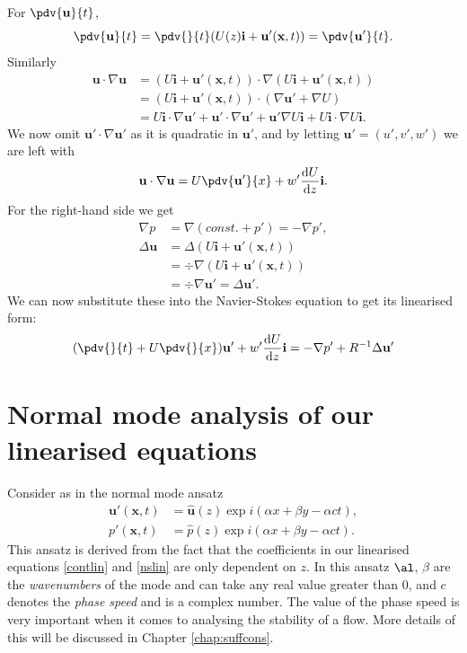 For $ \pdv{\mathbf{u}}{t} $, 
\begin{equation}
    \pdv{\mathbf{u}}{t} = \pdv{}{t} (U(z) \mathbf{i} + \mathbf{u}'(\mathbf{x}, t)) = \pdv{\mathbf{u}'}{t}.
\end{equation}
Similarly
\begin{align}
    \mathbf{u} \cdot \nabla \mathbf{u} &= (U \mathbf{i} + \mathbf{u}' (\mathbf{x}, t)) \cdot \nabla (U \mathbf{i} + \mathbf{u}' (\mathbf{x}, t)) \nonumber\\
    &= (U \mathbf{i} + \mathbf{u}' (\mathbf{x}, t)) \cdot (\nabla \mathbf{u}' + \nabla U) \nonumber\\
    &= U \mathbf{i} \cdot \nabla \mathbf{u}' + \mathbf{u}' \cdot \nabla \mathbf{u}' + \mathbf{u}' \nabla U \mathbf{i} + U \mathbf{i} \cdot \nabla U \mathbf{i}.
\end{align}
We now omit $ \mathbf{u}' \cdot \nabla \mathbf{u}' $ as it is quadratic in $ \mathbf{u}' $, and by letting $ \mathbf{u}' = (u', v', w') $ we are left with
\begin{equation}
    \mathbf{u} \cdot \nabla \mathbf{u} = U \pdv{\mathbf{u}'}{x} + w' \frac{\text{d}U}{\text{d}z} \mathbf{i}.
\end{equation}
For the right-hand side we get
\begin{align}
    \nabla p &= \nabla (const. + p') = -\nabla p', \nonumber\\
    \Delta \mathbf{u} &= \Delta (U \mathbf{i} + \mathbf{u}' (\mathbf{x}, t)) \nonumber\\
    &= \div{\nabla (U \mathbf{i} + \mathbf{u}' (\mathbf{x}, t))} \nonumber\\
    &= \div{\nabla \mathbf{u}'} = \Delta \mathbf{u}'.
\end{align}
We can now substitute these into the Navier-Stokes equation to get its linearised form:
\begin{equation}
    (\pdv{}{t} + U \pdv{}{x}) \mathbf{u}' + w' \frac{\text{d}U}{\text{d}z} \mathbf{i} = - \nabla p' + R^{-1} \Delta \mathbf{u}'
\label{nslin}
\end{equation}

\section{Normal mode analysis of our linearised equations}
Consider as in \citet{drazin2004hydrodynamic} the normal mode ansatz
\begin{align}
    \mathbf{u}' ( \mathbf{x}, t) &= \hat{\mathbf{u}}(z) \exp{i(\alpha x + \beta y - \alpha c t)}, \nonumber\\
    p'(\mathbf{x}, t) &= \hat{p}(z) \exp{i(\alpha x + \beta y - \alpha c t)}.
\label{osansatz}
\end{align}
This ansatz is derived from the fact that the coefficients in our linearised equations \eqref{contlin} and \eqref{nslin} are only dependent on $ z $. In this ansatz $ \al$, $ \beta$ are the \emph{wavenumbers} of the mode and can take any real value greater than $0 $, and $ c $ denotes the \emph{phase speed} and is a complex number. The value of the phase speed is very important when it comes to analysing the stability of a flow. More details of this will be discussed in Chapter \ref{chap:suffcons}.

